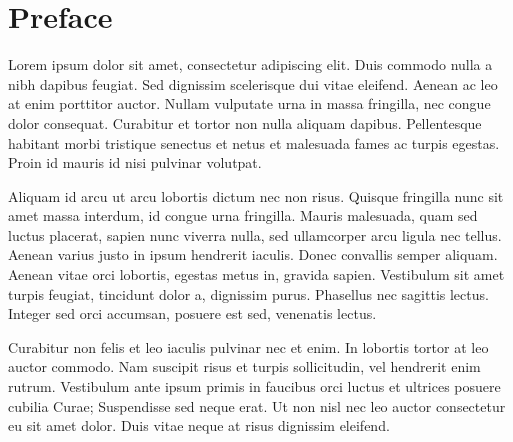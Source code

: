 \chapter*{Preface}

Lorem ipsum dolor sit amet, consectetur adipiscing elit. Duis commodo nulla a nibh dapibus feugiat. Sed dignissim scelerisque dui vitae eleifend. Aenean ac leo at enim porttitor auctor. Nullam vulputate urna in massa fringilla, nec congue dolor consequat. Curabitur et tortor non nulla aliquam dapibus. Pellentesque habitant morbi tristique senectus et netus et malesuada fames ac turpis egestas. Proin id mauris id nisi pulvinar volutpat.

Aliquam id arcu ut arcu lobortis dictum nec non risus. Quisque fringilla nunc sit amet massa interdum, id congue urna fringilla. Mauris malesuada, quam sed luctus placerat, sapien nunc viverra nulla, sed ullamcorper arcu ligula nec tellus. Aenean varius justo in ipsum hendrerit iaculis. Donec convallis semper aliquam. Aenean vitae orci lobortis, egestas metus in, gravida sapien. Vestibulum sit amet turpis feugiat, tincidunt dolor a, dignissim purus. Phasellus nec sagittis lectus. Integer sed orci accumsan, posuere est sed, venenatis lectus. 

Curabitur non felis et leo iaculis pulvinar nec et enim. In lobortis tortor at leo auctor commodo. Nam suscipit risus et turpis sollicitudin, vel hendrerit enim rutrum. Vestibulum ante ipsum primis in faucibus orci luctus et ultrices posuere cubilia Curae; Suspendisse sed neque erat. Ut non nisl nec leo auctor consectetur eu sit amet dolor. Duis vitae neque at risus dignissim eleifend.

